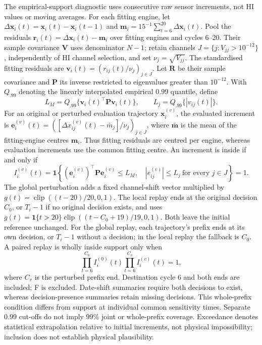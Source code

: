 \documentclass[12pt]{article}
\begin{document}
The empirical-support diagnostic uses consecutive raw sensor increments, not HI values or moving averages. For each fitting engine, let $\Delta\mathbf x_i(t)=\mathbf x_i(t)-\mathbf x_i(t-1)$ and $\mathbf m_i=15^{-1}\sum_{t=6}^{20}\Delta\mathbf x_i(t)$. Pool the residuals $\mathbf r_i(t)=\Delta\mathbf x_i(t)-\mathbf m_i$ over fitting engines and cycles 6--20. Their sample covariance $\mathbf V$ uses denominator $N-1$; retain channels $J=\{j:V_{jj}>10^{-12}\}$, independently of HI channel selection, and set $\nu_j=\sqrt{V_{jj}}$. The standardised fitting residuals are $\mathbf v_i(t)=(r_{ij}(t)/\nu_j)_{j\in J}$. Let $\mathbf R$ be their sample covariance and $\mathbf P$ its inverse restricted to eigenvalues greater than $10^{-12}$. With $Q_{.99}$ denoting the linearly interpolated empirical 0.99 quantile, define
\[
 L_M=Q_{.99}\{\mathbf v_i(t)^\top\mathbf P\mathbf v_i(t)\},
 \qquad L_j=Q_{.99}\{|v_{ij}(t)|\}.
\]
For an original or perturbed evaluation trajectory $\mathbf x_i^{(v)}$, the evaluated increment is $\mathbf e_i^{(v)}(t)=([\Delta x_{ij}^{(v)}(t)-\bar m_j]/\nu_j)_{j\in J}$, where $\bar{\mathbf m}$ is the mean of the fitting-engine centres $\mathbf m_i$. Thus fitting residuals are centred per engine, whereas evaluation increments use the common fitting centre. An increment is inside if and only if
\[
 I_i^{(v)}(t)=\mathbf1\!\left\{
 (\mathbf e_i^{(v)})^\top\mathbf P\mathbf e_i^{(v)}\leq L_M,
 \quad |e_{ij}^{(v)}|\leq L_j\ \text{for every }j\in J\right\}=1.
\]
The global perturbation adds a fixed channel-shift vector multiplied by $g(t)=\operatorname{clip}((t-20)/20,0,1)$. The local replay ends at the original decision $C_0$, or $T_i-1$ if no original decision exists, and uses $g(t)=\mathbf1\{t>20\}\operatorname{clip}((t-C_0+19)/19,0,1)$. Both leave the initial reference unchanged. For the global replay, each trajectory's prefix ends at its own decision, or $T_i-1$ without a decision; in the local replay the fallback is $C_0$. A paired replay is wholly inside support only when
\[
 \prod_{t=6}^{C_0} I_i^{(0)}(t)
 \prod_{t=6}^{C_v} I_i^{(v)}(t)=1,
\]
where $C_v$ is the perturbed prefix end. Destination cycle 6 and both ends are included; F is excluded. Date-shift summaries require both decisions to exist, whereas decision-presence summaries retain missing decisions. This whole-prefix condition differs from support at individual common sensitivity times. Separate 0.99 cut-offs do not imply 99\% joint or whole-prefix coverage. Exceedance denotes statistical extrapolation relative to initial increments, not physical impossibility; inclusion does not establish physical plausibility.
\end{document}
